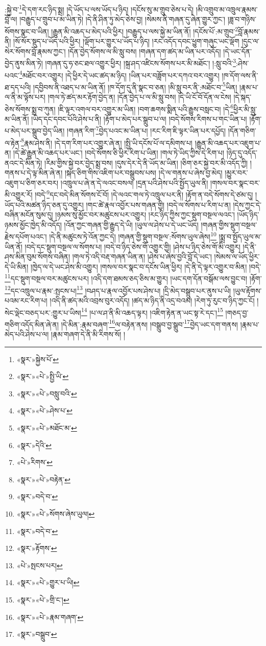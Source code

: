 :སྐྱེ་བ་\footnote{«སྣར་»སྐྱེས་པོ་}དེ་དག་རང་ཉིད་སྨྲ། །དེ་ཡོད་པ་ལས་ཡོད་པ་ཉིད། །དངོས་སུ་མ་གྲུབ་ཅེས་པ་དེ། །མི་འགྲུབ་མ་འཁྲུལ་རྣམས་བློ་ལ། །བརྒྱུད་པ་གྲུབ་པ་མ་ཡིན་ཏེ། །དེ་ནི་ཤིན་ཏུ་མེད་ཅེས་བྱ། །སེམས་ནི་གཞན་དུ་ཞེན་གྱུར་ཀྱང་། །ཟླ་བ་གཉིས་སོགས་སྣང་བ་ཡིན། །རྒྱུན་མི་འཆད་པ་མེད་པའི་ཕྱིར། །བརྒྱུད་པ་ལས་སྐྱེ་མ་ཡིན་ནོ། །དངོས་པོ་:མ་གྲུབ་\footnote{«སྣར་»«པེ་»སྤྱི་ཡི་}བློ་རྣམས་ནི། །སོ་སོར་སྡུད་པ་ཡོད་པའི་ཕྱིར། །ལྡོག་པར་གྱུར་པ་ཡོད་པ་ཉིད། །རང་འདོད་དབང་ཕྱུག་གཞུང་ཡང་ལྡོག །དུང་ལ་སེར་སོགས་བློ་རྣམས་ཀྱང་། །དོན་བྱེད་སོགས་ལ་མི་སླུ་བས། །གཞན་དག་ཚད་མ་ཡིན་པར་འདོད། །དེ་ཡང་དོན་བྱེད་ནུས་མིན་ཏེ། །གཞན་དུ་ཧ་ཅང་ཐལ་འགྱུར་ཕྱིར། །སྐྲ་ཤད་འཛིངས་སོགས་པར་མི་མཐོང་། །:སླུ་བའི་\footnote{«སྣར་»«པེ་»བསླུ་བའི་}:ཤེས་པའང་\footnote{«སྣར་»«པེ་»ཤེས་པ་}མཐོང་བར་འགྱུར། །དེ་ཕྱིར་དེ་ཡང་ཚད་མ་ཉིད། །ཡིན་པར་བཟློག་པར་དཀའ་བར་འགྱུར། །ཁ་དོག་ལས་ནི་ཐ་དད་པའི། །དབྱིབས་ནི་འཐད་པ་མ་ཡིན་ནོ། །ཁ་དོག་དུ་ནི་སྣང་བ་ཅན། །མི་སླུ་བར་ནི་:མཐོང་བ་\footnote{«སྣར་»«པེ་»མཐོང་མ་}ཡིན། །རྣམ་པ་ལ་ནི་མ་ལྟོས་པར། །གལ་ཏེ་ཚད་མར་རྟོག་བྱེད་ན། །དོན་བྱེད་པ་ལ་མི་སླུ་བས། །དེ་ཡི་ངོ་བོ་དོན་ལ་ངེས། །དེ་སྐད་ཅེས་སོགས་སྨྲ་བ་ཀུན། །ཇི་ལྟར་འགལ་བར་འགྱུར་མ་ཡིན། །བག་ཆགས་སྨིན་པའི་རྒྱུས་བསླང་བ། །དེ་\footnote{«སྣར་»དེའི་}ཕྱིར་མི་སླུ་མ་ཡིན་ནོ། །ཡིད་དང་དབང་པོའི་ཤེས་པ་ནི། །རྟོག་པ་མེད་པར་སྒྲུབ་པ་ལ། །བདེ་སོགས་རིགས་པ་གང་ཡིན་པ། །རྟོག་པ་མེད་པར་སྒྲུབ་བྱེད་ཡིན། །གཞན་རིག་\footnote{«པེ་»རིགས་}བྱེད་པའང་མ་ཡིན་པ། །རང་རིག་ཇི་ལྟར་ཡིན་པར་དཔྱོད། །དོན་གཅིག་ལ་རྟེན་\footnote{«སྣར་»«པེ་»བརྟེན་}རྣམ་ཤེས་ནི། །དེ་དག་རིག་པར་འགྱུར་ཞེ་ན། །སྤྱི་ཡི་དངོས་པོ་ལ་དམིགས་པ། །རྒྱུན་མི་འཆད་པར་འཇུག་པ་ན། །དེ་ཚེ་རྒྱུན་མི་འཆད་པར་ཡང་། །བདེ་སོགས་ཅི་ཕྱིར་རིག་པ་ཡིན། །གལ་ཏེ་ཡིད་ཀྱིས་དེ་རིག་པ། །ཉིད་དུ་འདོད་ནའང་དེ་མིན་ཏེ། །རིམ་གྱིས་སྐྱེ་བར་བྱེད་སྨྲ་བས། །དུས་དེར་དེ་ནི་ཡོད་མ་ཡིན། །ཅིག་ཅར་སྐྱེ་བར་མི་འདོད་ཀྱི། །
གནས་པ་དེ་ལྟ་མིན་ཞེ་ན། །སྐད་ཅིག་གིས་འཇིག་པར་བསྒྲུབས་པས། །དེ་ལ་གནས་པ་ཞེས་བྱ་མེད། །མྱུར་བར་འཇུག་པ་ཅིག་ཅར་བར། །འཁྲུལ་པ་ཞེ་ན་དེ་ལའང་བསལ། །དྲན་པའི་ཤེས་པའི་སྤྱོད་ཡུལ་ནི། །གསལ་བར་སྣང་བར་མི་འགྱུར་རོ། །བདེ་\footnote{«སྣར་»བདེ་བ་}དང་བདེ་མིན་སོགས་ངོ་བོ། །དེ་ལའང་གལ་ཏེ་འཁྲུལ་པར་ནི། །རྟོག་ན་བདེ་སོགས་དེ་ཙམ་དུ། །ཡོད་པའི་མཚན་ཉིད་ཅན་དུ་འགྱུར། །གང་ཚེ་རྣལ་འབྱོར་པས་གཞན་གྱི། །བདེ་ལ་སོགས་པ་རིག་པ་ན། །དེས་ཀྱང་དེ་བཞིན་མངོན་སུམ་དུ། །ཉམས་སུ་མྱོང་བར་མཚུངས་པར་འགྱུར། །རང་ཉིད་ཀྱིས་ཀྱང་སྡུག་བསྔལ་ལའང་། །ཡོད་ཉིད་ཉམས་མྱོང་ཁྱེད་མི་འདོད། །འོན་ཀྱང་གཞན་གྱི་རྒྱུད་དེ་ཡི། །ཡུལ་ལ་ཤེས་པ་དེ་ཡང་ཡོད། །གཞན་གྱིས་སྡུག་བསྔལ་རྗེས་དཔོག་པའང་། །དེ་ནི་མཚུངས་ཏེ་འོན་ཀྱང་དེ། །གཞན་གྱི་སྡུག་བསྔལ་:སོགས་ཡུལ་ཞེས།\footnote{«སྣར་»«པེ་»སོགས་ཞེས་ཡུལ།} །སྨྲ་བ་སྤྱོད་ཡུལ་མ་ཡིན་ནོ། །བདེ་དང་སྡུག་བསྔལ་ལ་སོགས་པ། །བདེ་བ་ཉིད་ཅེས་གོ་འགྱུར་གྱི། །ཤེས་པ་ཉིད་ཅེས་གོ་མི་འགྱུར། །དེ་ནི་ཤས་མིན་བུམ་སོགས་བཞིན། །གལ་ཏེ་འདི་བརྡ་གཞན་ཡིན་ན། །ཤེས་པ་ཞེས་བྱའི་བློ་དེ་ཡང་། །སེམས་ལ་ཡོད་ཕྱིར་དེ་ཡི་མིན། །ཁྱེད་ལ་དེ་ཡང་ཤེས་མི་འགྱུར། །གསལ་བར་སྣང་བ་དངོས་ཡིན་ཕྱིར། །དེ་ནི་དེ་ལྟར་འགྱུར་བ་མིན། །བདེ་\footnote{«སྣར་»བདེ་བ་}དང་སྡུག་བསྔལ་བར་མཚུངས་པར། །འདི་དག་ཐམས་ཅད་ཅིས་མ་གྱུར། །ཡང་དག་དོན་བསྒོམ་ལས་བྱུང་བ། །རྟོག་\footnote{«སྣར་»རྟོགས་}དང་འཁྲུལ་པ་རྣམ་:སྤངས་པ།\footnote{«པེ་»སྤངས་པར།} །བཤད་པ་རྣལ་འབྱོར་པས་ཤེས་པ། །དྲི་མེད་བསྒྲུབ་པར་ནུས་པ་ཡི། །ཡུལ་རྟོགས་པའམ་རང་རིག་པ། །འདི་ནི་ཚད་མའི་འབྲས་བུར་འདོད། །ཚད་མ་ཉིད་ནི་འདྲ་བའམ། །རེག་ཏུ་རུང་བ་ཉིད་ཀྱང་ངོ། །སེང་ལྡེང་བཅད་པར་:གྱུར་པ་ཡིས།\footnote{«སྣར་»«པེ་»གྱུར་པ་ཡི།} །པ་ལ་ཤ་ནི་མི་འཆད་ལྟར། །འཇིག་རྟེན་ན་ཡང་སྟ་རེ་དང་།\footnote{«སྣར་»«པེ་»གྲི་ང་།} །གཅད་བྱ་གཅིག་འདོད་མིན་ཞེ་ན། །དེ་མིན་:རྣམ་བཞག་\footnote{«སྣར་»«པེ་»རྣམ་གཞག་}ལ་བརྟེན་ནས། །བསྒྲུབ་བྱ་སྒྲུབ་\footnote{«སྣར་»བསྒྲུབ་}བྱེད་ཡང་དག་གནས། །རྣམ་པ་མེད་པའི་ཤེས་པ་ལ། །རྣམ་གཞག་དེ་ནི་མི་རིགས་སོ། །

